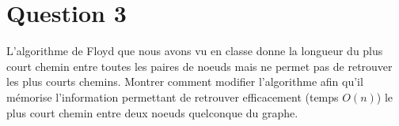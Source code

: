 \documentclass[devoir3.tex]{subfiles}
\begin{document}
\section*{Question 3}
L’algorithme de Floyd que nous avons vu en classe donne la longueur du plus court chemin entre toutes les paires de noeuds mais ne permet pas de retrouver les plus courts chemins. Montrer comment modifier l’algorithme afin qu’il mémorise l’information permettant de retrouver efficacement (temps \(O(n)\)) le plus court chemin entre deux noeuds quelconque du graphe.
\end{document}
